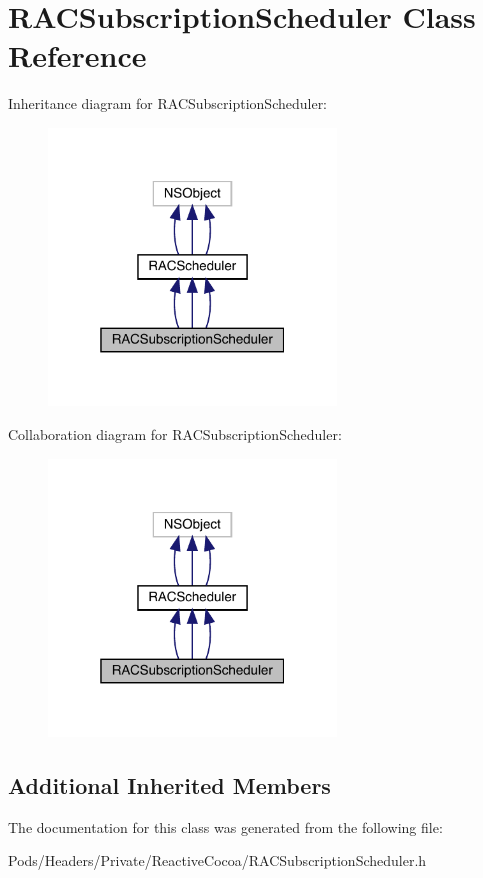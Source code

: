\hypertarget{interface_r_a_c_subscription_scheduler}{}\section{R\+A\+C\+Subscription\+Scheduler Class Reference}
\label{interface_r_a_c_subscription_scheduler}


Inheritance diagram for R\+A\+C\+Subscription\+Scheduler\+:\nopagebreak
\begin{figure}[H]
\begin{center}
\leavevmode
\includegraphics[width=217pt]{interface_r_a_c_subscription_scheduler__inherit__graph}
\end{center}
\end{figure}


Collaboration diagram for R\+A\+C\+Subscription\+Scheduler\+:\nopagebreak
\begin{figure}[H]
\begin{center}
\leavevmode
\includegraphics[width=217pt]{interface_r_a_c_subscription_scheduler__coll__graph}
\end{center}
\end{figure}
\subsection*{Additional Inherited Members}


The documentation for this class was generated from the following file\+:\begin{DoxyCompactItemize}
\item 
Pods/\+Headers/\+Private/\+Reactive\+Cocoa/R\+A\+C\+Subscription\+Scheduler.\+h\end{DoxyCompactItemize}
